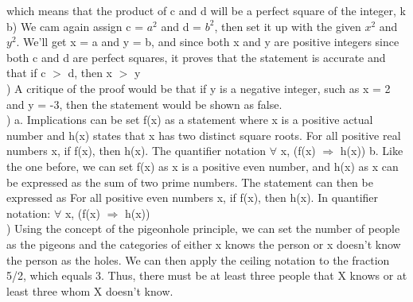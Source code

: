 \documentclass{article}
\begin{document}
\begin{spacing}{2}
  which means that the product of c and d will be a perfect square of the integer, k\\
  \newline
  b)  We cam again assign c = $a^{2}$ and d = $b^{2}$, then set it up with the given $x^{2}$ and $y^{2}$. We’ll get x = a and y = b, and since both x and y are positive integers since both c and d are perfect squares, it proves that the statement is accurate and that if c $>$ d, then x $>$ y\\
  ) A critique of the proof would be that if y is a negative integer, such as x = 2 and y = -3, then the statement would be shown as false.\\
  ) a. Implications can be set f(x) as a statement where x is a positive actual number and h(x) states that x has two distinct square roots. For all positive real numbers x, if f(x), then h(x). The quantifier notation $\forall$ x, (f(x) $\Rightarrow$ h(x)) b. Like the one before, we can set f(x) as x is a positive even number, and h(x) as x can be expressed as the sum of two prime numbers. The statement can then be expressed as For all positive even numbers x, if f(x), then h(x). In quantifier notation: $\forall$ x, (f(x) $\Rightarrow$ h(x))  \\
  ) Using the concept of the pigeonhole principle, we can set the number of people as the pigeons and the categories of either x knows the person or x doesn’t know the person as the holes. We can then apply the ceiling notation to the fraction 5/2, which equals 3. Thus, there must be at least three people that X knows or at least three whom X doesn’t know.
 
\end{spacing}
\end{document}
